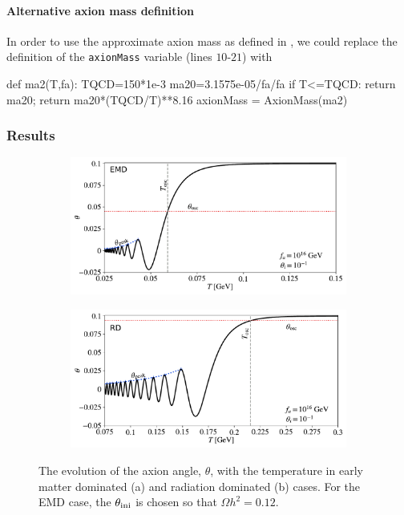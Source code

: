 \documentclass[11pt,a4paper]{article}
\begin{document}
\paragraph{Alternative axion mass definition}
%
In order to use the approximate axion mass as defined in , we could replace the definition of the {\tt axionMass} variable (lines $10$-$21$) with
%
\begin{py}
	def ma2(T,fa):
		TQCD=150*1e-3
		ma20=3.1575e-05/fa/fa
		if T<=TQCD:
			return ma20;
		return ma20*(TQCD/T)**8.16
	axionMass = AxionMass(ma2)
\end{py}

\subsubsection{Results}
%
\begin{figure}[h]
	\begin{subfigure}[]{0.5\textwidth}
		\includegraphics[width=1\textwidth]{theta_evolution-EMD.pdf}
		\caption{}
		\label{fig:theta_evolution-EMD}
	\end{subfigure}
	\begin{subfigure}[]{0.5\textwidth}
		\includegraphics[width=1\textwidth]{theta_evolution-RD.pdf}
		\caption{}
		\label{fig:theta_evolution-RD}
	\end{subfigure}
	\caption{The evolution of the axion angle, $\theta$, with the temperature in early matter dominated (a) and radiation dominated (b) cases. For the EMD case, the $\theta_{\rm ini}{}$ is chosen so that $\Omega h^2 = 0.12$.}
	\label{fig:results}
\end{figure}
\end{document}
